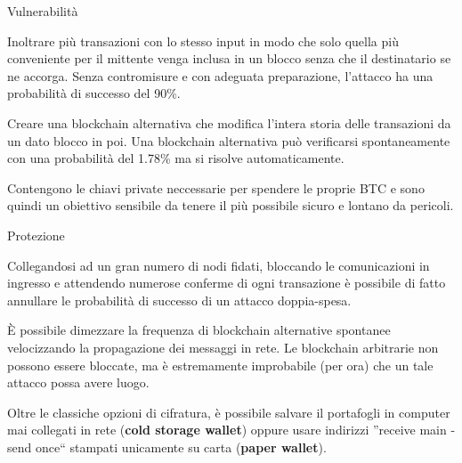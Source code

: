 \documentclass[italian]{beamer}
\begin{document}

\begin{frame}{Vulnerabilità} %
\justifying
 \begin{description}
 \justifying
  \item[Double-Spending] Inoltrare più transazioni con lo stesso input in modo che solo quella più conveniente per il mittente venga inclusa in un blocco senza che il destinatario se ne accorga. Senza contromisure e con adeguata preparazione, l'attacco ha una probabilità di successo del 90\%.
  \item[History Revision] Creare una blockchain alternativa che modifica l'intera storia delle transazioni da un dato blocco in poi. Una blockchain alternativa può verificarsi spontaneamente con una probabilità del 1.78\% ma si risolve automaticamente.
  \item[Portafogli] Contengono le chiavi private neccessarie per spendere le proprie BTC e sono quindi un obiettivo sensibile da tenere il più possibile sicuro e lontano da pericoli.
 \end{description}
\end{frame}

\begin{frame}{Protezione} %
\justifying
 \begin{description}
 \justifying
  \item[Double-Spending] Collegandosi ad un gran numero di nodi fidati, bloccando le comunicazioni in ingresso e attendendo numerose conferme di ogni transazione è possibile di fatto annullare le probabilità di successo di un attacco doppia-spesa.
  \item[History Revision] È possibile dimezzare la frequenza di blockchain alternative spontanee velocizzando la propagazione dei messaggi in rete. Le blockchain arbitrarie non possono essere bloccate, ma è estremamente improbabile (per ora) che un tale attacco possa avere luogo.
  \item[Portafogli] Oltre le classiche opzioni di cifratura, è possibile salvare il portafogli in computer mai collegati in rete (\textbf{cold storage wallet}) oppure usare indirizzi ''receive main - send once`` stampati unicamente su carta (\textbf{paper wallet}).
 \end{description}
\end{frame}
\end{document}
